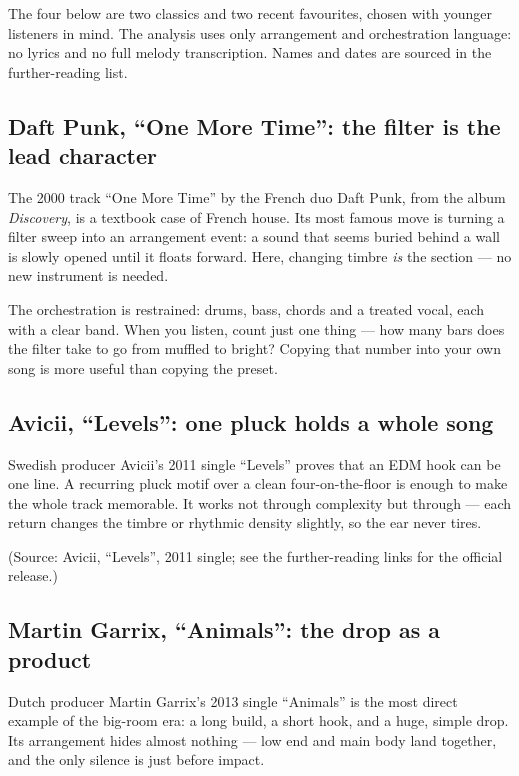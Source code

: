 The four below are two classics and two recent favourites, chosen with younger listeners in mind. The analysis uses only arrangement and orchestration language: no lyrics and no full melody transcription. Names and dates are sourced in the further-reading list.

\subsection{Daft Punk, ``One More Time'': the filter is the lead character}
\label{sec:edm-case-daft}

The 2000 track ``One More Time'' by the French duo Daft Punk, from the album \emph{Discovery}, is a textbook case of French house. Its most famous move is turning a filter sweep into an arrangement event: a sound that seems buried behind a wall is slowly opened until it floats forward. Here, changing timbre \emph{is} the section --- no new instrument is needed.

The orchestration is restrained: drums, bass, chords and a treated vocal, each with a clear band. When you listen, count just one thing --- how many bars does the filter take to go from muffled to bright? Copying that number into your own song is more useful than copying the preset.

\subsection{Avicii, ``Levels'': one pluck holds a whole song}
\label{sec:edm-case-avicii}

Swedish producer Avicii's 2011 single ``Levels'' proves that an EDM hook can be one line. A recurring pluck motif over a clean four-on-the-floor is enough to make the whole track memorable. It works not through complexity but through  --- each return changes the timbre or rhythmic density slightly, so the ear never tires.

(Source: Avicii, ``Levels'', 2011 single; see the further-reading links for the official release.)

\subsection{Martin Garrix, ``Animals'': the drop as a product}
\label{sec:edm-case-garrix}

Dutch producer Martin Garrix's 2013 single ``Animals'' is the most direct example of the big-room era: a long build, a short hook, and a huge, simple drop. Its arrangement hides almost nothing --- low end and main body land together, and the only silence is just before impact.

